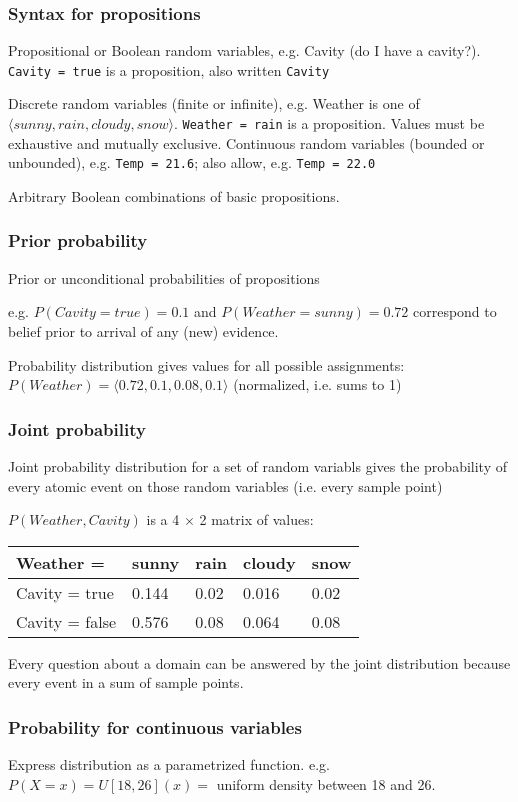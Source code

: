 \subsubsection{Syntax for propositions}
Propositional or Boolean random variables, e.g. Cavity (do I have a cavity?).
\verb|Cavity = true| is a proposition, also written \verb|Cavity|

Discrete random variables (finite or infinite), e.g. Weather is one of $\langle
sunny, rain, cloudy, snow\rangle$. \verb|Weather = rain| is a proposition.
Values must be exhaustive and mutually exclusive. Continuous random variables
(bounded or unbounded), e.g. \verb|Temp = 21.6|; also allow, e.g.
\verb|Temp = 22.0|

Arbitrary Boolean combinations of basic propositions.

\subsubsection{Prior probability}
Prior or unconditional probabilities of propositions

e.g. $P(Cavity = true) = 0.1$ and $P(Weather = sunny) = 0.72$ correspond to
belief prior to arrival of any (new) evidence.

Probability distribution gives values for all possible assignments: $P(Weather)
= \langle 0.72, 0.1, 0.08, 0.1 \rangle$ (normalized, i.e. sums to 1)

\subsubsection{Joint probability}
Joint probability distribution for a set of random variabls gives the
probability of every atomic event on those random variables (i.e. every sample
point)

$P(Weather,Cavity)$ is a 4 $\times$ 2 matrix of values:
\begin{tabular}{l | l l l l}
    Weather =      & sunny & rain & cloudy & snow\\ \hline
    Cavity = true  & 0.144 & 0.02 & 0.016  & 0.02\\
    Cavity = false & 0.576 & 0.08 & 0.064  & 0.08
\end{tabular}

Every question about a domain can be answered by the joint distribution because
every event in a sum of sample points.

\subsubsection{Probability for continuous variables}
Express distribution as a parametrized function. e.g. $P(X = x) = U[18,26](x) =
$ uniform density between 18 and 26.

